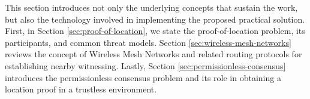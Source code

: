 This section introduces not only the underlying concepts that sustain the work, but also the technology involved in implementing the proposed practical solution. First, in Section \ref{sec:proof-of-location}, we state the proof-of-location problem, its participants, and common threat models. Section \ref{sec:wireless-mesh-networks} reviews the concept of Wireless Mesh Networks and related routing protocols for establishing nearby witnessing. Lastly, Section \ref{sec:permissionless-consensus} introduces the permissionless consensus problem and its role in obtaining a location proof in a trustless environment.

